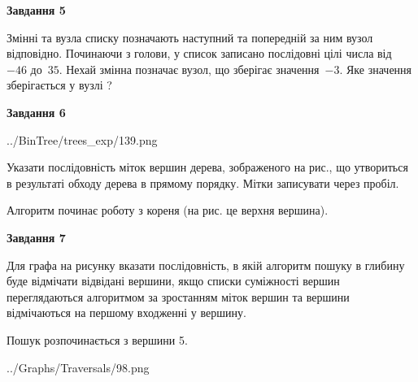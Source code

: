 \documentclass[12pt, ukrainian]{article}
\begin{document}
{\begin {large}
{\begin {center}\textbf{Завдання 5}\end {center}}\par
Змінні  та  вузла списку позначають наступний та попередній за ним вузол відповідно. Починаючи з голови, у список записано послідовні цілі числа від~$-46$ до~$35$. Нехай змінна  позначає вузол, що зберігає значення~$-3$.
Яке значення зберігається у вузлі  ?\par
\newpage

{\begin {center}\textbf{Завдання 6}\end {center}}\par

\begin{center}
	{../BinTree/trees_exp/139.png}
\end{center}
Указати послідовність міток вершин дерева, зображеного на рис., що утвориться в результаті обходу дерева в прямому порядку. Мітки записувати через пробіл.\par Алгоритм починає роботу з кореня (на рис. це верхня вершина).\par
\newpage

{\begin {center}\textbf{Завдання 7}\end {center}}\par
Для графа на рисунку вказати послідовність, в якій алгоритм пошуку в глибину буде відмічати відвідані вершини, якщо списки суміжності вершин переглядаються алгоритмом за зростанням міток вершин та вершини відмічаються на першому вход\-женні у вершину.\par
Пошук розпочинається з вершини 5.\par

\begin{center}
	{../Graphs/Traversals/98.png}
\end{center}\par
\newpage


\end{large}}
\end{document}
